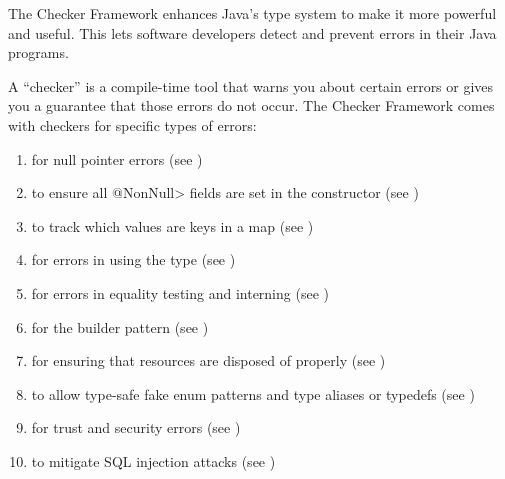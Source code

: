 \htmlhr
{}

The Checker Framework enhances Java's type system to make it more powerful
and useful.
This lets software developers detect and
prevent errors in their Java programs.

A ``checker'' is a compile-time tool that warns you about certain errors or gives you a
guarantee that those errors do not occur.
The Checker Framework comes with checkers for specific types of errors:

\begin{enumerate}

\item
   for null pointer errors
  (see )
\item
   to ensure all
  \<@NonNull> fields are set in the constructor (see
  )
\item
   to track which values are
  keys in a map (see )
\item
   for errors in using the
   type (see
  )
\item
   for errors in equality
  testing and interning (see )
\item
   for
  the builder pattern (see )
\item
   for ensuring that resources are disposed of properly
  (see )
\item
   to allow type-safe fake enum
  patterns and type aliases or typedefs (see )
\item
   for trust and security errors
  (see )
\item
   to mitigate SQL injection
  attacks
  (see )

\end{enumerate}

